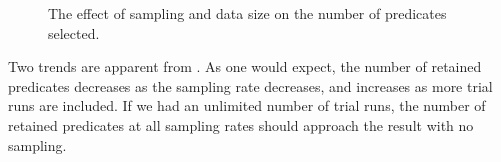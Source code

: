 \begin{figure}
  \hfill

  \caption{The effect of sampling and data size on the number of
  predicates selected.}\label{fig:predkept}
\end{figure}

Two trends are apparent from .  As one would expect,
the number of retained predicates decreases as the sampling rate decreases,
and increases as more trial runs are included.  If we had an unlimited number
of trial runs, the number of retained predicates at all sampling rates should
approach the result with no sampling.  

